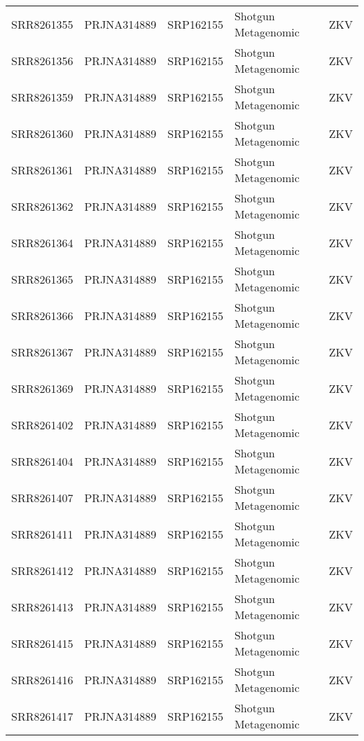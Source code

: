 \begin{longtable}{@{}lllll@{}}
SRR8261355 & PRJNA314889 & SRP162155 & Shotgun Metagenomic   & ZKV      \\
SRR8261356 & PRJNA314889 & SRP162155 & Shotgun Metagenomic   & ZKV      \\
SRR8261359 & PRJNA314889 & SRP162155 & Shotgun Metagenomic   & ZKV      \\
SRR8261360 & PRJNA314889 & SRP162155 & Shotgun Metagenomic   & ZKV      \\
SRR8261361 & PRJNA314889 & SRP162155 & Shotgun Metagenomic   & ZKV      \\
SRR8261362 & PRJNA314889 & SRP162155 & Shotgun Metagenomic   & ZKV      \\
SRR8261364 & PRJNA314889 & SRP162155 & Shotgun Metagenomic   & ZKV      \\
SRR8261365 & PRJNA314889 & SRP162155 & Shotgun Metagenomic   & ZKV      \\
SRR8261366 & PRJNA314889 & SRP162155 & Shotgun Metagenomic   & ZKV      \\
SRR8261367 & PRJNA314889 & SRP162155 & Shotgun Metagenomic   & ZKV      \\
SRR8261369 & PRJNA314889 & SRP162155 & Shotgun Metagenomic   & ZKV      \\
SRR8261402 & PRJNA314889 & SRP162155 & Shotgun Metagenomic   & ZKV      \\
SRR8261404 & PRJNA314889 & SRP162155 & Shotgun Metagenomic   & ZKV      \\
SRR8261407 & PRJNA314889 & SRP162155 & Shotgun Metagenomic   & ZKV      \\
SRR8261411 & PRJNA314889 & SRP162155 & Shotgun Metagenomic   & ZKV      \\
SRR8261412 & PRJNA314889 & SRP162155 & Shotgun Metagenomic   & ZKV      \\
SRR8261413 & PRJNA314889 & SRP162155 & Shotgun Metagenomic   & ZKV      \\
SRR8261415 & PRJNA314889 & SRP162155 & Shotgun Metagenomic   & ZKV      \\
SRR8261416 & PRJNA314889 & SRP162155 & Shotgun Metagenomic   & ZKV      \\
SRR8261417 & PRJNA314889 & SRP162155 & Shotgun Metagenomic   & ZKV  \bottomrule   
\end{longtable}
